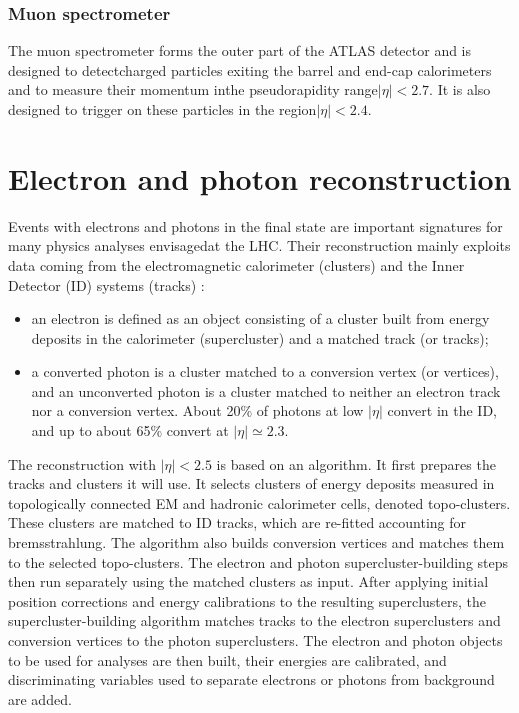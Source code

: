\documentclass[a4paper, oneside]{book}
\begin{document}
		
			\subsection{Muon spectrometer}
			The  muon  spectrometer  forms  the  outer  part  of  the  ATLAS  detector  and  is  designed  to  detectcharged particles exiting the barrel and end-cap calorimeters and to measure their momentum inthe pseudorapidity range$|\eta|<2.7$.  It is also designed to trigger on these particles in the region$|\eta|<2.4$.
			
	
\newpage

	\chapter{Electron and photon reconstruction}
		Events with electrons and photons in the final state are important signatures for many physics analyses envisagedat the LHC. Their reconstruction mainly  exploits data coming from the electromagnetic calorimeter (clusters) and the Inner Detector (ID) systems (tracks) \cite{El ph intro}: 
		\begin{itemize}
			\item an electron is defined as an object consisting of a cluster built from energy deposits in the
			calorimeter (supercluster) and a matched track (or tracks);
			\item a  converted photon is a cluster matched to a conversion vertex (or vertices), and an unconverted photon is a cluster matched to neither an
			electron track nor a conversion vertex. About 20\% of photons at low $|\eta|$ convert in the ID, and up to about 65\% convert at $|\eta| \simeq 2.3$.
		\end{itemize}
		The reconstruction  with $|\eta| < 2.5$ is based on an algorithm. It first prepares the tracks and clusters it will use. It selects clusters of energy deposits measured in topologically connected EM and hadronic calorimeter cells, denoted topo-clusters. These clusters are matched to ID tracks, which are re-fitted accounting for bremsstrahlung. The algorithm also builds conversion vertices and matches them to the selected topo-clusters. The electron and photon supercluster-building steps then run separately using the matched clusters as input. After applying initial position corrections and energy
		calibrations to the resulting superclusters, the supercluster-building algorithm matches tracks to the electron superclusters and conversion vertices to the photon superclusters. The electron and photon
		objects to be used for analyses are then built, their energies are calibrated, and discriminating
		variables used to separate electrons or photons from background are added.
		
\end{document}
